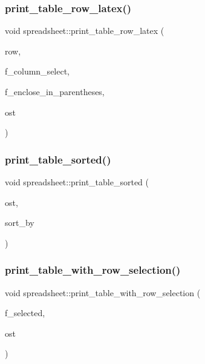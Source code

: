 \subsubsection{\texorpdfstring{print\+\_\+table\+\_\+row\+\_\+latex()}{print\_table\_row\_latex()}}
{\footnotesize\ttfamily void spreadsheet\+::print\+\_\+table\+\_\+row\+\_\+latex (\begin{DoxyParamCaption}\item[{\mbox{\hyperlink{galois_8h_a09fddde158a3a20bd2dcadb609de11dc}{I\+NT}}}]{row,  }\item[{\mbox{\hyperlink{galois_8h_a09fddde158a3a20bd2dcadb609de11dc}{I\+NT}} $\ast$}]{f\+\_\+column\+\_\+select,  }\item[{\mbox{\hyperlink{galois_8h_a09fddde158a3a20bd2dcadb609de11dc}{I\+NT}}}]{f\+\_\+enclose\+\_\+in\+\_\+parentheses,  }\item[{ostream \&}]{ost }\end{DoxyParamCaption})}

\mbox{\label{classspreadsheet_ab1449d4cae40dd8c52d92f7edf95433a}} 
\subsubsection{\texorpdfstring{print\+\_\+table\+\_\+sorted()}{print\_table\_sorted()}}
{\footnotesize\ttfamily void spreadsheet\+::print\+\_\+table\+\_\+sorted (\begin{DoxyParamCaption}\item[{ostream \&}]{ost,  }\item[{const \mbox{\hyperlink{galois_8h_ab6cc7b4aeb6ea31aba2b3fbfc83ff5e6}{B\+Y\+TE}} $\ast$}]{sort\+\_\+by }\end{DoxyParamCaption})}

\mbox{\label{classspreadsheet_a3aa06208e17db09764a716398533ffb8}} 
\subsubsection{\texorpdfstring{print\+\_\+table\+\_\+with\+\_\+row\+\_\+selection()}{print\_table\_with\_row\_selection()}}
{\footnotesize\ttfamily void spreadsheet\+::print\+\_\+table\+\_\+with\+\_\+row\+\_\+selection (\begin{DoxyParamCaption}\item[{\mbox{\hyperlink{galois_8h_a09fddde158a3a20bd2dcadb609de11dc}{I\+NT}} $\ast$}]{f\+\_\+selected,  }\item[{ostream \&}]{ost }\end{DoxyParamCaption})}

